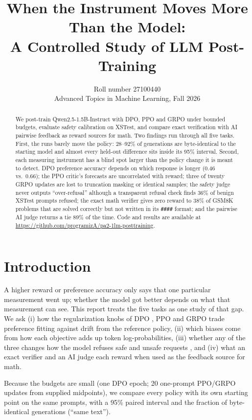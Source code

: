 \documentclass{article}
\title{When the Instrument Moves More Than the Model:\\ A Controlled Study of LLM Post-Training}
\author{Roll number 27100440\\Advanced Topics in Machine Learning, Fall 2026}
\begin{document}
\maketitle

\begin{abstract}
We post-train Qwen2.5-1.5B-Instruct with DPO, PPO and GRPO under bounded budgets, evaluate safety calibration on XSTest, and compare exact verification with AI pairwise feedback as reward sources for math. Two findings run through all five tasks. First, the runs barely move the policy: 28--92\% of generations are byte-identical to the starting model and almost every held-out difference sits inside its 95\% interval. Second, each measuring instrument has a blind spot larger than the policy change it is meant to detect. DPO preference accuracy depends on which response is longer (0.46 vs.\ 0.66); the PPO critic's forecasts are uncorrelated with reward; three of twenty GRPO updates are lost to truncation masking or identical samples; the safety judge never outputs ``over-refusal'' although a transparent refusal check finds 36\% of benign XSTest prompts refused; the exact math verifier gives zero reward to 38\% of GSM8K problems that are solved correctly but not written in its \texttt{\#\#\#\#} format; and the pairwise AI judge returns a tie 89\% of the time. Code and results are available at \url{https://github.com/programizA/pa2-1lm-posttraining}.
\end{abstract}

\section{Introduction}
A higher reward or preference accuracy only says that one particular measurement went up; whether the model got better depends on what that measurement can see. This report treats the five tasks as one study of that gap. We ask (i) how the regularization knobs of DPO \citep{rafailov2023dpo}, PPO \citep{schulman2017ppo} and GRPO \citep{shao2024deepseekmath} trade preference fitting against drift from the reference policy, (ii) which biases come from how each objective adds up token log-probabilities, (iii) whether any of the three changes how the model refuses safe and unsafe requests \citep{rottger2024xstest}, and (iv) what an exact verifier and an AI judge each reward when used as the feedback source for math.

Because the budgets are small (one DPO epoch; 20 one-prompt PPO/GRPO updates from supplied midpoints), we compare every policy with its own starting point on the same prompts, with a 95\% paired interval and the fraction of byte-identical generations (``same text''). 
\end{document}
